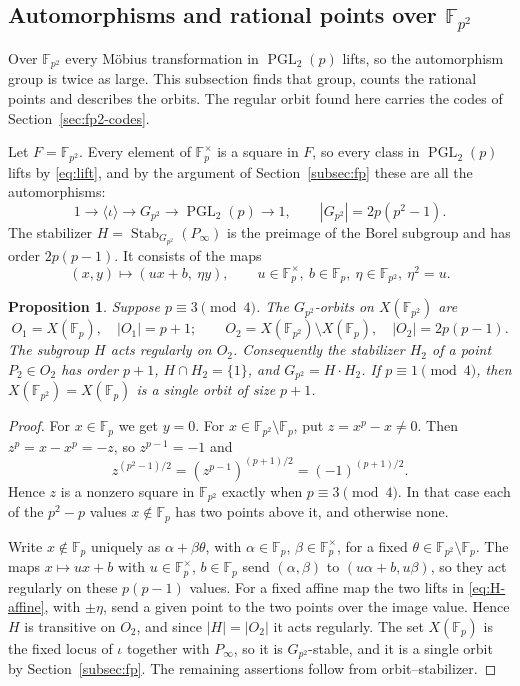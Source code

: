 \documentclass[12pt,letterpaper]{article}
\newtheorem{proposition}[theorem]{Proposition}
\theoremstyle{definition}
\theoremstyle{remark}
\numberwithin{equation}{section}
\newcommand{\F}{\mathbb{F}}
\newcommand{\Stab}{\operatorname{Stab}}
\newcommand{\PGL}{\operatorname{PGL}}
\begin{document}
\subsection{\texorpdfstring{Automorphisms and rational points over $\F_{p^2}$}{Automorphisms and rational points over F\_\{p\textasciicircum 2\}}}
\label{subsec:fp2}

Over $\F_{p^2}$ every M\"obius transformation in $\PGL_2(p)$ lifts, so
the automorphism group is twice as large. This subsection finds that
group, counts the rational points and describes the orbits. The regular
orbit found here carries the codes of Section~\ref{sec:fp2-codes}.

Let $F=\F_{p^2}$.  Every element of $\F_p^\times$ is a square in $F$, so
every class in $\PGL_2(p)$ lifts by \eqref{eq:lift}, and by the argument
of Section~\ref{subsec:fp} these are all the automorphisms:
\begin{equation}\label{eq:gq-order}
1\to\langle\iota\rangle\to G_{p^2}\to\PGL_2(p)\to1,
\qquad |G_{p^2}|=2p(p^2-1).
\end{equation}
The stabilizer $H=\Stab_{G_{p^2}}(P_\infty)$ is the preimage of the Borel
subgroup and has order $2p(p-1)$.  It consists of the maps
\begin{equation}\label{eq:H-affine}
(x,y)\longmapsto(ux+b,\ \eta y),
\qquad u\in\F_p^\times,\ b\in\F_p,\ \eta\in\F_{p^2},\ \eta^2=u.
\end{equation}

\begin{proposition}\label{prop:orbits}
Suppose $p\equiv3\pmod4$.  The $G_{p^2}$-orbits on $X(\F_{p^2})$ are
\[
O_1=X(\F_p),\quad|O_1|=p+1;\qquad
O_2=X(\F_{p^2})\setminus X(\F_p),\quad|O_2|=2p(p-1).
\]
The subgroup $H$ acts regularly on $O_2$.  Consequently the stabilizer
$H_2$ of a point $P_2\in O_2$ has order $p+1$, $H\cap H_2=\{1\}$, and
$G_{p^2}=H\cdot H_2$.  If $p\equiv1\pmod4$, then $X(\F_{p^2})=X(\F_p)$ is
a single orbit of size $p+1$.
\end{proposition}
\begin{proof}
For $x\in\F_p$ we get $y=0$.  For $x\in\F_{p^2}\setminus\F_p$, put
$z=x^p-x\ne0$.  Then $z^p=x-x^p=-z$, so $z^{p-1}=-1$ and
\[
z^{(p^2-1)/2}=(z^{p-1})^{(p+1)/2}=(-1)^{(p+1)/2}.
\]
Hence $z$ is a nonzero square in $\F_{p^2}$ exactly when $p\equiv3\pmod4$.
In that case each of the $p^2-p$ values $x\notin\F_p$ has two points
above it, and otherwise none.

Write $x\notin\F_p$ uniquely as $\alpha+\beta\theta$, with
$\alpha\in\F_p$, $\beta\in\F_p^\times$, for a fixed
$\theta\in\F_{p^2}\setminus\F_p$.  The maps $x\mapsto ux+b$ with
$u\in\F_p^\times$, $b\in\F_p$ send $(\alpha,\beta)$ to
$(u\alpha+b,u\beta)$, so they act regularly on these $p(p-1)$ values.
For a fixed affine map the two lifts in \eqref{eq:H-affine}, with
$\pm\eta$, send a given point to the two points over the image value.
Hence $H$ is transitive on $O_2$, and since $|H|=|O_2|$ it acts
regularly.  The set $X(\F_p)$ is the fixed locus of $\iota$ together with
$P_\infty$, so it is $G_{p^2}$-stable, and it is a single orbit by
Section~\ref{subsec:fp}.  The remaining assertions follow from
orbit--stabilizer.
\end{proof}
\end{document}
